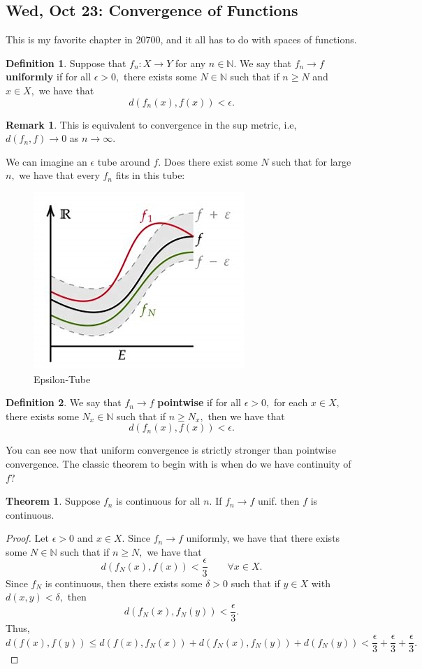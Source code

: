 \documentclass[10pt, oneside]{article}
\newcommand{\bbN}{\mathbb{N}}
\theoremstyle{definition}
\newtheorem{thm}{Theorem}
\newtheorem{defn}{Definition}
\newtheorem{rem}{Remark}
\begin{document}
\subsection{Wed, Oct 23: Convergence of Functions}
This is my favorite chapter in 20700, and it all has to do with spaces of functions.
\begin{defn}
Suppose that $f_n: X\to Y$ for any $n\in \bbN.$
    We say that $f_n \to f$ \textbf{uniformly} if for all $\epsilon>0,$ there exists some $N \in \bbN$ such that if $n\geq N$ and $x\in X,$ we have that 
    \[d(f_n(x), f(x))< \epsilon.\]
\end{defn}
\begin{rem}
    This is equivalent to convergence in the sup metric, i.e, $d(f_n, f)\to 0$ as $n\to \infty.$
\end{rem}
We can imagine an $\epsilon$ tube around $f.$ Does there exist some $N$ such that for large $n,$ we have that every $f_n$ fits in this tube:
\begin{figure}[H]
    \centering
    \includegraphics[width=0.5\linewidth]{Images/EpisilonTube.png}
    \caption{Epsilon-Tube}
\end{figure}
\begin{defn}
    We say that $f_n \to f$ \textbf{pointwise} if for all $\epsilon>0,$ for each $x \in X,$ there exists some $N_x \in \bbN$ such that if $n\geq N_x,$ then we have that 
    \[d(f_n(x), f(x))< \epsilon.\]
\end{defn}
You can see now that uniform convergence is strictly stronger than pointwise convergence. The classic theorem to begin with is when do we have continuity of $f?$
\begin{thm}
Suppose $f_n$ is continuous for all $n.$ If $f_n \to f$ unif. then $f$ is continuous.
\end{thm}
\begin{proof}
Let $\epsilon>0$ and $x\in X.$ Since $f_n \to f$ uniformly, we have that there exists some $N \in \bbN$ such that if $n\geq N,$ we have that 
\[d(f_N(x), f(x))< \frac{\epsilon}{3}\qquad \forall x\in X.\] Since $f_N$ is continuous, then there exists some $\delta>0$ such that if $y\in X$ with $d(x,y)< \delta,$ then 
\[d(f_N(x), f_N(y))< \frac{\epsilon}{3}.\] Thus, 
    \[d(f(x),f(y))\leq d(f(x), f_N(x)) + d(f_N(x), f_N(y)) + d(f_N(y))  < \frac{\epsilon}{3} + \frac{\epsilon}{3} + \frac{\epsilon}{3}.\]
\end{proof}
\end{document}

